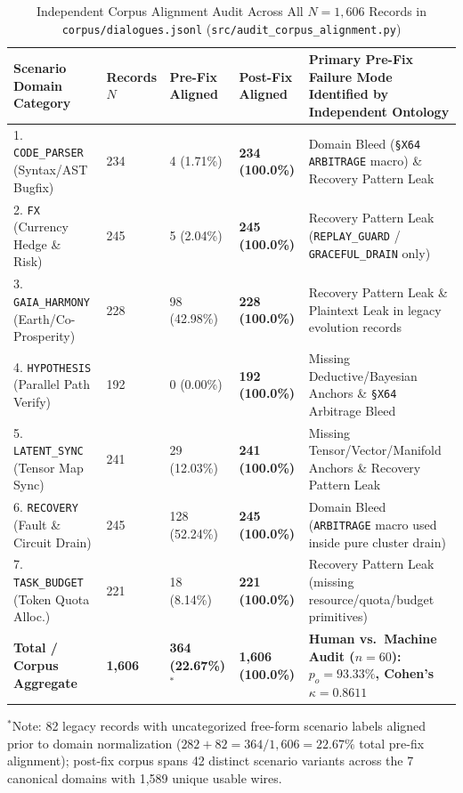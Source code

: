 \documentclass[9pt,a4paper]{extarticle}
\begin{document}
\begin{table}[h!]
\centering
\caption{Independent Corpus Alignment Audit Across All $N = 1{,}606$ Records in \texttt{corpus/dialogues.jsonl} (\texttt{src/audit\_corpus\_alignment.py})}
\label{tab:corpus_alignment}
\footnotesize
\renewcommand{\arraystretch}{1.08}
\begin{tabularx}{\textwidth}{L{3.4cm} R{1.3cm} R{2.1cm} R{2.1cm} Y}
\toprule
{}
\textbf{\color{white}Scenario Domain Category} &
\textbf{\color{white}Records $N$} &
\textbf{\color{white}Pre-Fix Aligned} &
\textbf{\color{white}Post-Fix Aligned} &
\textbf{\color{white}Primary Pre-Fix Failure Mode Identified by Independent Ontology} \\
. \texttt{CODE\_PARSER} (Syntax/AST Bugfix) & 234 & 4 (1.71\%) & \textbf{234 (100.0\%)} & Domain Bleed (\texttt{\S X64 ARBITRAGE} macro) \& Recovery Pattern Leak \\
2. \texttt{FX} (Currency Hedge \& Risk) & 245 & 5 (2.04\%) & \textbf{245 (100.0\%)} & Recovery Pattern Leak (\texttt{REPLAY\_GUARD} / \texttt{GRACEFUL\_DRAIN} only) \\
3. \texttt{GAIA\_HARMONY} (Earth/Co-Prosperity) & 228 & 98 (42.98\%) & \textbf{228 (100.0\%)} & Recovery Pattern Leak \& Plaintext Leak in legacy evolution records \\
4. \texttt{HYPOTHESIS} (Parallel Path Verify) & 192 & 0 (0.00\%) & \textbf{192 (100.0\%)} & Missing Deductive/Bayesian Anchors \& \texttt{\S X64} Arbitrage Bleed \\
5. \texttt{LATENT\_SYNC} (Tensor Map Sync) & 241 & 29 (12.03\%) & \textbf{241 (100.0\%)} & Missing Tensor/Vector/Manifold Anchors \& Recovery Pattern Leak \\
6. \texttt{RECOVERY} (Fault \& Circuit Drain) & 245 & 128 (52.24\%) & \textbf{245 (100.0\%)} & Domain Bleed (\texttt{ARBITRAGE} macro used inside pure cluster drain) \\
7. \texttt{TASK\_BUDGET} (Token Quota Alloc.) & 221 & 18 (8.14\%) & \textbf{221 (100.0\%)} & Recovery Pattern Leak (missing resource/quota/budget primitives) \\
\midrule
\textbf{Total / Corpus Aggregate} & \textbf{1,606} & \textbf{364 (22.67\%)}$^*$ & \textbf{1,606 (100.0\%)} & \textbf{Human vs.\ Machine Audit ($n=60$): $p_o = 93.33\%$, Cohen's $\kappa = 0.8611$} \\
\bottomrule
\end{tabularx}
\vspace{1pt}
{\scriptsize $^*$Note: 82 legacy records with uncategorized free-form scenario labels aligned prior to domain normalization ($282 + 82 = 364/1{,}606 = 22.67\%$ total pre-fix alignment); post-fix corpus spans 42 distinct scenario variants across the 7 canonical domains with 1,589 unique usable wires.}
\end{table}
\end{document}
